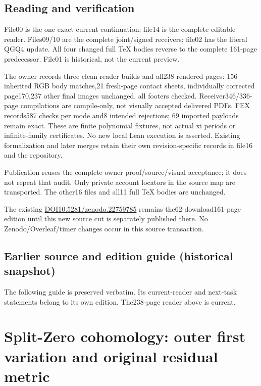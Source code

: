 \documentclass[
]{article}
\begin{document}
\subsection{Reading and verification}\label{reading-and-verification}

File00 is the one exact current continuation; file14 is the complete
editable reader. Files09/10 are the complete joint/signed receivers;
file02 has the literal QGQ4 update. All four changed full TeX bodies
reverse to the complete 161-page predecessor. File01 is historical, not
the current preview.

The owner records three clean reader builds and all238 rendered pages:
156 inherited RGB body matches,21 fresh-page contact sheets,
individually corrected page170,237 other final images unchanged, all
footers checked. Receiver346/336-page compilations are compile-only, not
visually accepted delivered PDFs. FEX records587 checks per mode and8
intended rejections; 69 imported payloads remain exact. These are finite
polynomial fixtures, not actual xi periods or infinite-family
certificates. No new local Lean execution is asserted. Existing
formalization and later merges retain their own revision-specific
records in file16 and the repository.

Publication reuses the complete owner proof/source/visual acceptance; it
does not repeat that audit. Only private account locators in the source
map are transported. The other16 files and all11 full TeX bodies are
unchanged.

The existing
\href{https://doi.org/10.5281/zenodo.22759785}{DOI10.5281/zenodo.22759785}
remains the62-download161-page edition until this new source cut is
separately published there. No Zenodo/Overleaf/timer changes occur in
this source transaction.

\subsection{Earlier source and edition guide (historical
snapshot)}\label{earlier-source-and-edition-guide-historical-snapshot-5}

The following guide is preserved verbatim. Its current-reader and
next-task statements belong to its own edition. The238-page reader above
is current.

\section{Split-Zero cohomology: outer first variation and original
residual
metric}\label{split-zero-cohomology-outer-first-variation-and-original-residual-metric}
\end{document}
